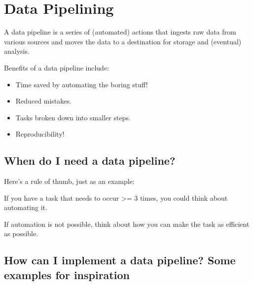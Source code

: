 \documentclass[
  letterpaper,
  DIV=11,
  numbers=noendperiod]{scrreprt}
\providecommand{\tightlist}{%
  \setlength{\itemsep}{0pt}\setlength{\parskip}{0pt}}\usepackage{longtable,booktabs,array}
\begin{document}

\hypertarget{data-pipelining}{%
\chapter*{Data Pipelining}\label{data-pipelining}}


A data pipeline is a series of (automated) actions that ingests raw data
from various sources and moves the data to a destination for storage and
(eventual) analysis.

Benefits of a data pipeline include:

\begin{itemize}
\tightlist
\item
  Time saved by automating the boring stuff!
\item
  Reduced mistakes.
\item
  Tasks broken down into smaller steps.
\item
  Reproducibility!
\end{itemize}

\hypertarget{when-do-i-need-a-data-pipeline}{%
\section*{When do I need a data
pipeline?}\label{when-do-i-need-a-data-pipeline}}


Here's a rule of thumb, just as an example:

If you have a task that needs to occur \textgreater= 3 times, you could
think about automating it.

If automation is not possible, think about how you can make the task as
efficient as possible.

\hypertarget{how-can-i-implement-a-data-pipeline-some-examples-for-inspiration}{%
\section*{How can I implement a data pipeline? Some examples for
inspiration}\label{how-can-i-implement-a-data-pipeline-some-examples-for-inspiration}}
\end{document}
